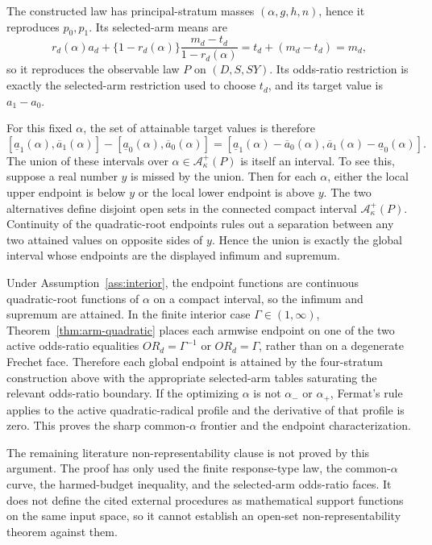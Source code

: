 The constructed law has principal-stratum masses \((\alpha,g,h,n)\), hence it
reproduces \(p_0,p_1\).  Its selected-arm means are
\[
  r_d(\alpha)a_d+\{1-r_d(\alpha)\}
  \frac{m_d-t_d}{1-r_d(\alpha)}
  =
  t_d+(m_d-t_d)
  =
  m_d,
\]
so it reproduces the observable law \(P\) on \((D,S,SY)\).  Its odds-ratio
restriction is exactly the selected-arm restriction used to choose \(t_d\), and
its target value is \(a_1-a_0\).

For this fixed \(\alpha\), the set of attainable target values is therefore
\[
  [\underline a_1(\alpha),\overline a_1(\alpha)]
  -
  [\underline a_0(\alpha),\overline a_0(\alpha)]
  =
  [\underline a_1(\alpha)-\overline a_0(\alpha),
   \overline a_1(\alpha)-\underline a_0(\alpha)].
\]
The union of these intervals over \(\alpha\in\mathcal A_\kappa^+(P)\) is itself
an interval.  To see this, suppose a real number \(y\) is missed by the union.
Then for each \(\alpha\), either the local upper endpoint is below \(y\) or the
local lower endpoint is above \(y\).  The two alternatives define disjoint open
sets in the connected compact interval \(\mathcal A_\kappa^+(P)\).  Continuity
of the quadratic-root endpoints rules out a separation between any two
attained values on opposite sides of \(y\).  Hence the union is exactly the
global interval whose endpoints are the displayed infimum and supremum.

Under Assumption~\ref{ass:interior}, the endpoint functions are continuous
quadratic-root functions of \(\alpha\) on a compact interval, so the infimum
and supremum are attained.  In the finite interior case \(\Gamma\in(1,\infty)\),
Theorem~\ref{thm:arm-quadratic} places each armwise endpoint on one of the two
active odds-ratio equalities \(OR_d=\Gamma^{-1}\) or \(OR_d=\Gamma\), rather
than on a degenerate Frechet face.  Therefore each global endpoint is attained
by the four-stratum construction above with the appropriate selected-arm
tables saturating the relevant odds-ratio boundary.  If the optimizing
\(\alpha\) is not \(\alpha_-\) or \(\alpha_+\), Fermat's rule applies to the
active quadratic-radical profile and the derivative of that profile is zero.
This proves the sharp common-\(\alpha\) frontier and the endpoint
characterization.

The remaining literature non-representability clause is not proved by this
argument.  The proof has only used the finite response-type law, the
common-\(\alpha\) curve, the harmed-budget inequality, and the selected-arm
odds-ratio faces.  It does not define the cited external procedures as
mathematical support functions on the same input space, so it cannot establish
an open-set non-representability theorem against them.

